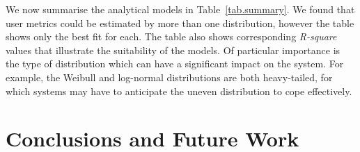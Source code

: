 \documentclass[letterpaper,nocopyrightspace]{sig-alternate}
\newcommand{\capttext}{\protect\centering\em}
\begin{document}
\begin{table}[tb]
\caption{\capttext A summary of metrics with their corresponding
distributions} \label{tab.summary}
\end{table}

We now summarise the analytical models in Table~\ref{tab.summary}.
We found that user metrics could be estimated by more than one
distribution, however the table shows only the best fit for each.
The table also shows corresponding {\em R-square} values that illustrate
the suitability of the models. Of particular importance is the type of
distribution which can have a significant impact on the system. For example,
the Weibull and log-normal distributions are both heavy-tailed, for which
systems may have to anticipate the uneven distribution to cope effectively.



\section{Conclusions and Future Work}
\label{sect:conclusion}
\end{document}
